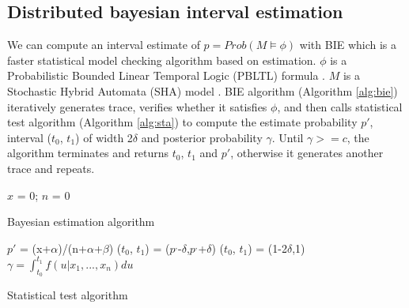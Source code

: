 \subsection{Distributed bayesian interval estimation}

We can compute an interval estimate of $p=Prob(M\models\phi)$ with BIE which is a faster statistical model checking algorithm based on estimation. $\phi$ is a Probabilistic Bounded Linear Temporal Logic (PBLTL) formula \cite{baier2008principles}. $M$ is a Stochastic Hybrid Automata (SHA) model \cite{David2014Statistical}. BIE algorithm (Algorithm \ref{alg:bie}) iteratively generates trace, verifies whether it satisfies $\phi$, and then calls statistical test algorithm (Algorithm \ref{alg:sta}) to compute the estimate probability $p'$, interval ($t_0$, $t_1$) of width 2$\delta$ and posterior probability $\gamma$. Until $\gamma >= c$, the algorithm terminates and returns $t_0$, $t_1$ and $p'$, otherwise it generates another trace and repeats.

\begin{algorithm}[t]
{}
$x$ = 0; $n$ = 0\;
\caption{Bayesian estimation algorithm}
\label{alg:bie}
\end{algorithm}


\begin{algorithm}[t]
{}
        $p'$ = (x+$\alpha$)/(n+$\alpha$+$\beta$)\;
        ($t_0$, $t_1$) = ($p^,$-$\delta$,$p^,$+$\delta$)\;
        {
           ($t_0$, $t_1$) = (1-2$\delta$,1)\;
         }{
          }
        $\gamma=\int_{t_0}^{t_1} {f(u|x_1,...,x_n)du}$\;
\caption{Statistical test algorithm}
\label{alg:sta}
\end{algorithm}

